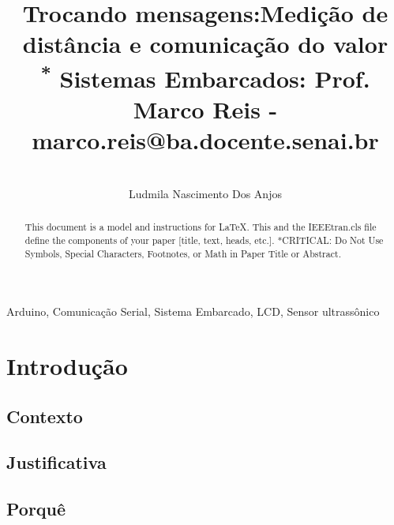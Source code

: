 \documentclass[conference]{IEEEtran}
\begin{document}
\title{Trocando mensagens:Medição de distância e comunicação do valor\\
{\footnotesize \textsuperscript{*} Sistemas Embarcados: Prof. Marco Reis - marco.reis@ba.docente.senai.br}
}


\author{
    \IEEEauthorblockN\centerline{}{Ludmila Nascimento Dos Anjos}
    \and
}
\maketitle

\begin{abstract}
    This document is a model and instructions for \LaTeX.
    This and the IEEEtran.cls file define the components of your paper [title, text, heads, etc.]. *CRITICAL: Do Not Use Symbols, Special Characters, Footnotes,
    or Math in Paper Title or Abstract.
\end{abstract}

\begin{IEEEkeywords}
    Arduino, Comunicação Serial, Sistema Embarcado, LCD, Sensor ultrassônico
\end{IEEEkeywords}

\section{Introdução}

\subsection{Contexto}

\subsection{Justificativa}

\subsection{Porquê}
\end{document}
